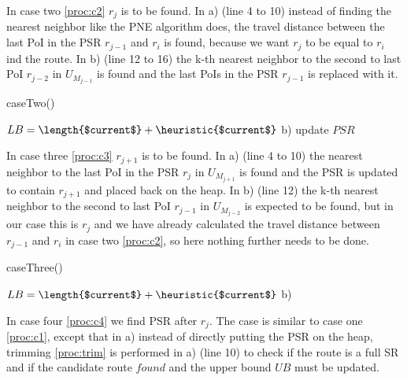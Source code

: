 In case two \ref{proc:c2} $r_j$ is to be found. In a) (line 4 to 10) instead of finding the nearest neighbor like the PNE algorithm does, the travel distance between the last PoI in the PSR $r_{j-1}$ and $r_i$ is found, because we want $r_j$ to be equal to $r_i$ ind the route. In b) (line 12 to 16) the k-th nearest neighbor to the second to last PoI $r_{j-2}$ in $U_{M_{j-1}}$ is found and the last PoIs in the PSR $r_{j-1}$ is replaced with it.

\begin{procedure}[H]
	\label{proc:c2}
	\caption{caseTwo()}
	
	$LB = \length{$current$} + \heuristic{$current$}$\;
	b) \;
	update $PSR$\;
\end{procedure}

\flushbottom

In case three \ref{proc:c3} $r_{j+1}$ is to be found. In a) (line 4 to 10) the nearest neighbor to the last PoI in the PSR $r_j$ in $U_{M_{j+1}}$ is found and the PSR is updated to contain $r_{j+1}$ and placed back on the heap. In b) (line 12) the k-th nearest neighbor to the second to last PoI $r_{j-1}$ in $U_{M_{j-2}}$ is expected to be found, but in our case this is $r_j$ and we have already calculated the travel distance between $r_{j-1}$ and $r_i$ in case two \ref{proc:c2}, so here nothing further needs to be done.

\begin{procedure}[htb!]
	\label{proc:c3}
	\caption{caseThree()}
	
	$LB = \length{$current$} + \heuristic{$current$}$\;
	b) 
\end{procedure}

In case four \ref{proc:c4} we find PSR after $r_j$. The case is similar to case one \ref{proc:c1}, except that in a) instead of directly putting the PSR on the heap, trimming \ref{proc:trim} is performed in a) (line 10) to check if the route is a full SR and if the candidate route $found$ and the upper bound $UB$ must be updated.

